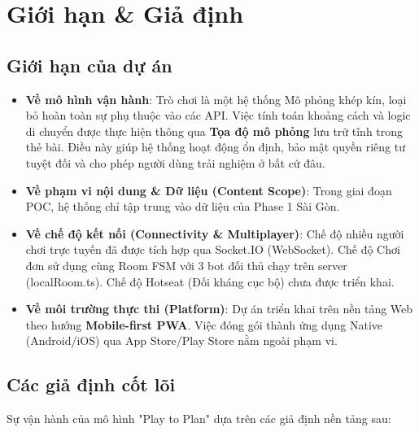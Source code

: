 \newpage

\chapter{Giới hạn \& Giả định}

\section{Giới hạn của dự án}

\begin{itemize}[topsep=0pt, itemsep=2.5pt, leftmargin=1.5cm]
    \item \textbf{Về mô hình vận hành}: Trò chơi là một hệ thống Mô phỏng khép kín, loại bỏ hoàn toàn sự phụ thuộc vào các API. Việc tính toán khoảng cách và logic di chuyển được thực hiện thông qua \textbf{Tọa độ mô phỏng} lưu trữ tĩnh trong thẻ bài. Điều này giúp hệ thống hoạt động ổn định, bảo mật quyền riêng tư tuyệt đối và cho phép người dùng trải nghiệm ở bất cứ đâu.

    \item \textbf{Về phạm vi nội dung \& Dữ liệu (Content Scope)}: Trong giai đoạn POC, hệ thống chỉ tập trung vào dữ liệu của Phase 1 Sài Gòn.

    \item \textbf{Về chế độ kết nối (Connectivity \& Multiplayer)}: Chế độ nhiều người chơi trực tuyến đã được tích hợp qua Socket.IO (WebSocket). Chế độ Chơi đơn sử dụng cùng Room FSM với 3 bot đối thủ chạy trên server (localRoom.ts). Chế độ Hotseat (Đối kháng cục bộ) chưa được triển khai.

    \item \textbf{Về môi trường thực thi (Platform)}: Dự án triển khai trên nền tảng Web theo hướng \textbf{Mobile-first PWA}. Việc đóng gói thành ứng dụng Native (Android/iOS) qua App Store/Play Store nằm ngoài phạm vi.
\end{itemize}

\section{Các giả định cốt lõi}

Sự vận hành của mô hình "Play to Plan" dựa trên các giả định nền tảng sau:

